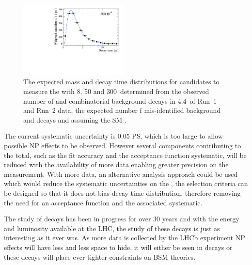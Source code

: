 \begin{figure}[tbp]
        \includegraphics[width=0.49\textwidth]{./Figs/Summary/300fb_time.pdf}
    \caption{The expected mass and decay time distributions for \bsmumu candidates to measure the \el with 8, 50 and 300~\fb determined from the observed number of \bsmumu and combinatorial background decays in 4.4~\fb of Run~1 and Run~2 data, the expected number f mis-identified background and \bdmumu decays and assuming the SM \bsmumu \BF.}
    \label{fig:expected_dist}
\end{figure}





The current systematic uncertainty is 0.05 \ps which is too large to allow possible NP effects to be observed. However several components contributing to the total, such as the fit accuracy and the acceptance function systematic, will be reduced with the availability of more data enabling greater precision on the measurement. With more data, an alternative analysis approach could be used which would reduce the systematic uncertainties on the \el, the selection criteria can be designed so that it does not bias \bsmumu decay time distribution, therefore removing the need for an acceptance function and the associated systematic.


The study of \bmumu decays has been in progress for over 30 years and with the energy and luminosity available at the LHC, the study of these decays is just as interesting as it ever was. As more data is collected by the LHCb experiment NP effects will have less and less space to hide, it will either be seen in \bmumu decays or these decays will place ever tighter constraints on BSM theories. 

